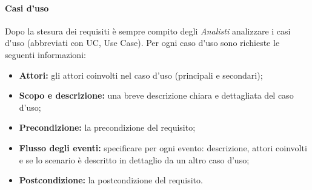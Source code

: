 \paragraph{Casi d'uso}
Dopo la stesura dei requisiti è sempre compito degli \textit{Analisti} analizzare i \gls{casi d'uso} (abbreviati con UC, Use Case).
Per ogni \gls{caso d'uso} sono richieste le seguenti informazioni:
\begin{itemize}
	\item \textbf{Attori:} gli attori coinvolti nel caso d'uso (principali e secondari);
	\item \textbf{Scopo e descrizione:} una breve descrizione chiara e dettagliata del caso d'uso;
	\item \textbf{Precondizione:} la precondizione del requisito;
	\item \textbf{Flusso degli eventi:} specificare per ogni evento: descrizione, attori coinvolti e se lo scenario è descritto in dettaglio da un altro caso d'uso;
	\item \textbf{Postcondizione:} la postcondizione del requisito.
\end{itemize}


